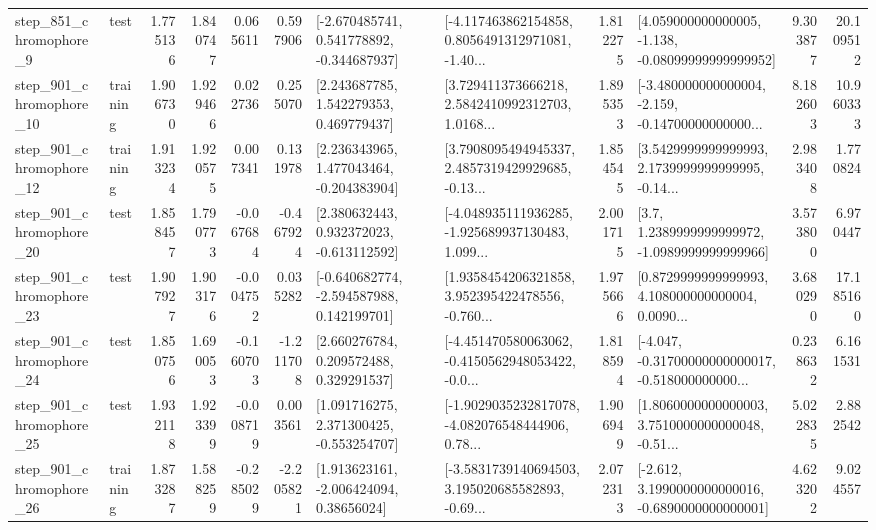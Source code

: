 \begin{tabular}{llrrrrllrlrr}
   step\_851\_chromophore\_9 &      test &      1.775136 &    1.840747 &      0.065611 &  0.597906 &   [-2.670485741, 0.541778892, -0.344687937] &  [-4.117463862154858, 0.8056491312971081, -1.40... &       1.812275 &  [4.059000000000005, -1.138, -0.08099999999999952] &            9.303877 &         20.109512 \\
  step\_901\_chromophore\_10 &  training &      1.906730 &    1.929466 &      0.022736 &  0.255070 &     [2.243687785, 1.542279353, 0.469779437] &  [3.729411373666218, 2.5842410992312703, 1.0168... &       1.895353 &  [-3.480000000000004, -2.159, -0.14700000000000... &            8.182603 &         10.960333 \\
  step\_901\_chromophore\_12 &  training &      1.913234 &    1.920575 &      0.007341 &  0.131978 &    [2.236343965, 1.477043464, -0.204383904] &  [3.7908095494945337, 2.4857319429929685, -0.13... &       1.854545 &  [3.5429999999999993, 2.1739999999999995, -0.14... &            2.983408 &          1.770824 \\
  step\_901\_chromophore\_20 &      test &      1.858457 &    1.790773 &     -0.067684 & -0.467924 &    [2.380632443, 0.932372023, -0.613112592] &  [-4.048935111936285, -1.925689937130483, 1.099... &       2.001715 &     [3.7, 1.2389999999999972, -1.0989999999999966] &            3.573800 &          6.970447 \\
  step\_901\_chromophore\_23 &      test &      1.907927 &    1.903176 &     -0.004752 &  0.035282 &   [-0.640682774, -2.594587988, 0.142199701] &  [1.9358454206321858, 3.952395422478556, -0.760... &       1.975666 &  [0.8729999999999993, 4.108000000000004, 0.0090... &            3.680290 &         17.185160 \\
  step\_901\_chromophore\_24 &      test &      1.850756 &    1.690053 &     -0.160703 & -1.211708 &     [2.660276784, 0.209572488, 0.329291537] &  [-4.451470580063062, -0.4150562948053422, -0.0... &       1.818594 &  [-4.047, -0.31700000000000017, -0.518000000000... &            0.238632 &          6.161531 \\
  step\_901\_chromophore\_25 &      test &      1.932118 &    1.923399 &     -0.008719 &  0.003561 &    [1.091716275, 2.371300425, -0.553254707] &  [-1.9029035232817078, -4.082076548444906, 0.78... &       1.906949 &  [1.8060000000000003, 3.7510000000000048, -0.51... &            5.022835 &          2.882542 \\
  step\_901\_chromophore\_26 &  training &      1.873287 &    1.588259 &     -0.285029 & -2.205821 &     [1.913623161, -2.006424094, 0.38656024] &  [-3.5831739140694503, 3.195020685582893, -0.69... &       2.072313 &  [-2.612, 3.1990000000000016, -0.6890000000000001] &            4.623202 &          9.024557 \\

\end{tabular}
